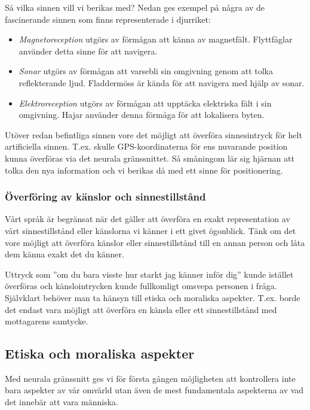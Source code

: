 \documentclass[12pt, a4paper]{article}
\begin{document}
Så vilka sinnen vill vi berikas med? Nedan ges exempel på några av de
fascinerande sinnen som finns representerade i djurriket:

\begin{itemize}
	\item \textit{Magnetoreception} utgörs av förmågan att känna av magnetfält.
	Flyttfåglar använder detta sinne för att navigera.
	\item \textit{Sonar} utgörs av förmågan att varsebli sin omgivning genom att
	tolka reflekterande ljud. Fladdermöss är kända för att navigera med hjälp av
	sonar.
	\item \textit{Elektroreception} utgörs av förmågan att upptäcka elektriska
	fält i sin omgivning. Hajar använder denna förmåga för att lokalisera byten.
\end{itemize}

Utöver redan befintliga sinnen vore det möjligt att överföra sinnesintryck för
helt artificiella sinnen. T.ex. skulle GPS-koordinaterna för ens nuvarande
position kunna överföras via det neurala gränssnittet. Så småningom lär sig
hjärnan att tolka den nya information och vi berikas då med ett sinne för
positionering.

\subsubsection{Överföring av känslor och sinnestillstånd}

Vårt språk är begränsat när det gäller att överföra en exakt representation av
vårt sinnestillstånd eller känslorna vi känner i ett givet ögonblick. Tänk om
det vore möjligt att överföra känslor eller sinnestillstånd till en annan person
och låta dem känna exakt det du känner.

Uttryck som ''om du bara visste hur starkt jag känner inför dig'' kunde istället
överföras och känslointrycken kunde fullkomligt omsvepa personen i fråga.
Självklart behöver man ta hänsyn till etiska och moraliska aspekter. T.ex. borde
det endast vara möjligt att överföra en känsla eller ett sinnestillstånd med
mottagarens samtycke.


\subsection{Etiska och moraliska aspekter}

Med neurala gränssnitt ges vi för första gången möjligheten att kontrollera inte
bara aspekter av vår omvärld utan även de mest fundamentala aspekterna av vad
det innebär att vara människa.
\end{document}
